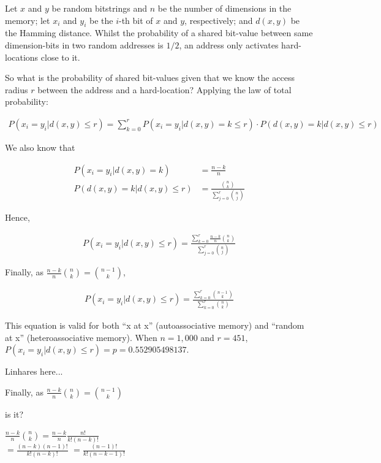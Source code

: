 \documentclass[12pt]{article}
\begin{document}
Let $x$ and $y$ be random bitstrings and $n$ be the number of dimensions in the memory; let $x_i$ and $y_i$ be the $i$-th bit of $x$ and $y$, respectively; and $d(x, y)$ be the Hamming distance. Whilst the probability of a shared bit-value between same dimension-bits in two random addresses is $1/2$, an address only activates hard-locations close to it.

So what is the probability of shared bit-values given that we know the access radius $r$ between the address and a hard-location?  Applying the law of total probability:

\begin{align}
P(x_i = y_i | d(x, y) \le r) = \sum_{k=0}^{r} P(x_i = y_i | d(x, y) = k \le r) \cdot P(d(x, y) = k | d(x, y) \le r)
\end{align}

We also know that

\begin{align}
P(x_i = y_i | d(x, y) = k) &= \frac{n-k}{n} \\
P(d(x, y) = k | d(x, y) \le r) &= \frac{\binom{n}{k}}{\sum_{j=0}^{r} \binom{n}{j}}
\end{align}

Hence,

\begin{align}
P(x_i = y_i | d(x, y) \le r) = \frac{\sum_{k=0}^{r} \frac{n-k}{n} \binom{n}{k}}{\sum_{j=0}^{r} \binom{n}{j}}
\end{align}

Finally, as $\frac{n-k}{n} \binom{n}{k} = \binom{n-1}{k}$,

\begin{align}
P(x_i = y_i | d(x, y) \le r) = \frac{\sum_{k=0}^{r} \binom{n-1}{k}}{\sum_{k=0}^{r} \binom{n}{k}}
\end{align}

This equation is valid for both ``x at x'' (autoassociative memory) and ``random at x'' (heteroassociative memory). When $n=1,000$ and $r=451$, $P(x_i = y_i | d(x, y) \le r) = p = 0.552905498137$.




Linhares here...

Finally, as $\frac{n-k}{n} \binom{n}{k} = \binom{n-1}{k}$

is it?


  $\frac{n-k}{n} \binom{n}{k} = \frac{n-k}{n} \frac{n!}{k!(n-k)!}$ \\
  $ = \frac{(n-k)(n-1)!}{k!(n-k)!} $
  $ = \frac{(n-1)!}{k!(n-k-1)!}$
\end{document}
